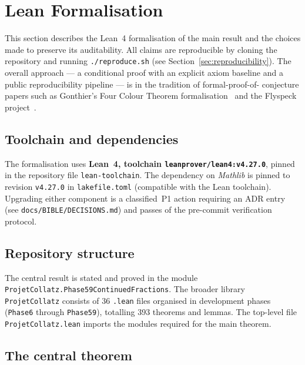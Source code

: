 
\section{Lean Formalisation}
\label{sec:lean}

This section describes the Lean~4 formalisation of the main result and the
choices made to preserve its auditability. All claims are reproducible
by cloning the repository and running \texttt{./reproduce.sh}
(see Section~\ref{sec:reproducibility}). The overall approach --- a
conditional proof with an explicit axiom baseline and a public
reproducibility pipeline --- is in the tradition of formal-proof-of-
conjecture papers such as Gonthier's Four Colour Theorem
formalisation~\cite{Gonthier2008} and the Flyspeck
project~\cite{Hales2017Flyspeck}.

\subsection{Toolchain and dependencies}

The formalisation uses \textbf{Lean~4, toolchain \texttt{leanprover/lean4:v4.27.0}},
pinned in the repository file \texttt{lean-toolchain}. The dependency on
\emph{Mathlib} is pinned to revision \texttt{v4.27.0} in \texttt{lakefile.toml}
(compatible with the Lean toolchain). Upgrading either component is a
classified~P1 action requiring an ADR entry (see
\texttt{docs/BIBLE/DECISIONS.md}) and passes of the pre-commit verification
protocol.

\subsection{Repository structure}

The central result is stated and proved in the module
\texttt{ProjetCollatz.Phase59ContinuedFractions}. The broader library
\texttt{ProjetCollatz} consists of 36 \texttt{.lean} files organised in
development phases (\texttt{Phase6} through \texttt{Phase59}), totalling 393
theorems and lemmas. The top-level file \texttt{ProjetCollatz.lean} imports
the modules required for the main theorem.

\subsection{The central theorem}

